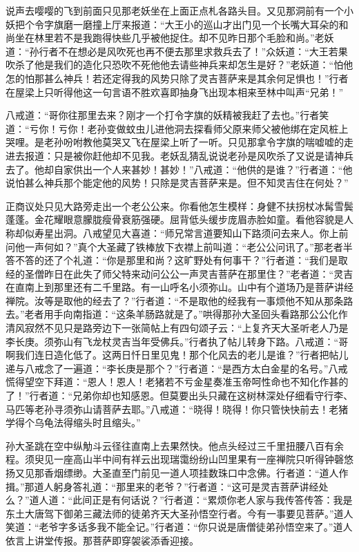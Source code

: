 \documentclass[12pt,UTF8]{ctexbook}
\begin{document}
{说声去嘤嘤的飞到前面只见那老妖坐在上面正点札各路头目。又见那洞前有一个小妖把个令字旗磨一磨撞上厅来报道：“大王小的巡山才出门见一个长嘴大耳朵的和尚坐在林里若不是我跑得快些几乎被他捉住。却不见昨日那个毛脸和尚。”老妖道：“孙行者不在想必是风吹死也再不便去那里求救兵去了！”众妖道：“大王若果吹杀了他是我们的造化只恐吹不死他他去请些神兵来却怎生是好？”老妖道：“怕他怎的怕那甚么神兵！若还定得我的风势只除了灵吉菩萨来是其余何足惧也！”行者在屋梁上只听得他这一句言语不胜欢喜即抽身飞出现本相来至林中叫声“兄弟！”

八戒道：“哥你往那里去来？刚才一个打令字旗的妖精被我赶了去也。”行者笑道：“亏你！亏你！老孙变做蚊虫儿进他洞去探看师父原来师父被他绑在定风桩上哭哩。是老孙吩咐教他莫哭又飞在屋梁上听了一听。只见那拿令字旗的喘嘘嘘的走进去报道：只是被你赶他却不见我。老妖乱猜乱说说老孙是风吹杀了又说是请神兵去了。他却自家供出一个人来甚妙！甚妙！”八戒道：“他供的是谁？”行者道：“他说怕甚么神兵那个能定他的风势！只除是灵吉菩萨来是。但不知灵吉住在何处？”

正商议处只见大路旁走出一个老公公来。你看他怎生模样：身健不扶拐杖冰髯雪鬓蓬蓬。金花耀眼意朦胧瘦骨衰筋强硬。屈背低头缓步庞眉赤脸如童。看他容貌是人称却似寿星出洞。八戒望见大喜道：“师兄常言道要知山下路须问去来人。你上前问他一声何如？”真个大圣藏了铁棒放下衣襟上前叫道：“老公公问讯了。”那老者半答不答的还了个礼道：“你是那里和尚？这旷野处有何事干？”行者道：“我们是取经的圣僧昨日在此失了师父特来动问公公一声灵吉菩萨在那里住？”老者道：“灵吉在直南上到那里还有二千里路。有一山呼名小须弥山。山中有个道场乃是菩萨讲经禅院。汝等是取他的经去了？”行者道：“不是取他的经我有一事烦他不知从那条路去。”老者用手向南指道：“这条羊肠路就是了。”哄得那孙大圣回头看路那公公化作清风寂然不见只是路旁边下一张简帖上有四句颂子云：“上复齐天大圣听老人乃是李长庚。须弥山有飞龙杖灵吉当年受佛兵。”行者执了帖儿转身下路。八戒道：“哥啊我们连日造化低了。这两日忏日里见鬼！那个化风去的老儿是谁？”行者把帖儿递与八戒念了一遍道：“李长庚是那个？”行者道：“是西方太白金星的名号。”八戒慌得望空下拜道：“恩人！恩人！老猪若不亏金星奏准玉帝呵性命也不知化作甚的了！”行者道：“兄弟你却也知感恩。但莫要出头只藏在这树林深处仔细看守行李、马匹等老孙寻须弥山请菩萨去耶。”八戒道：“晓得！晓得！你只管快快前去！老猪学得个乌龟法得缩头时且缩头。”

孙大圣跳在空中纵觔斗云径往直南上去果然快。他点头经过三千里扭腰八百有余程。须臾见一座高山半中间有祥云出现瑞霭纷纷山凹里果有一座禅院只听得钟磬悠扬又见那香烟缥缈。大圣直至门前见一道人项挂数珠口中念佛。行者道：“道人作揖。”那道人躬身答礼道：“那里来的老爷？”行者道：“这可是灵吉菩萨讲经处么？”道人道：“此间正是有何话说？”行者道：“累烦你老人家与我传答传答：我是东土大唐驾下御弟三藏法师的徒弟齐天大圣孙悟空行者。今有一事要见菩萨。”道人笑道：“老爷字多话多我不能全记。”行者道：“你只说是唐僧徒弟孙悟空来了。”道人依言上讲堂传报。那菩萨即穿袈裟添香迎接。

}
\end{document}
